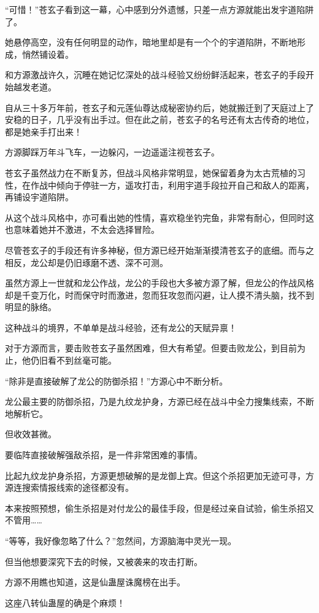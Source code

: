 \begin{this_body}
“可惜！”苍玄子看到这一幕，心中感到分外遗憾，只差一点方源就能出发宇道陷阱了。

她悬停高空，没有任何明显的动作，暗地里却是有一个个的宇道陷阱，不断地形成，悄然铺设着。

和方源激战许久，沉睡在她记忆深处的战斗经验又纷纷鲜活起来，苍玄子的手段开始越发老道。

自从三十多万年前，苍玄子和元莲仙尊达成秘密协约后，她就搬迁到了天庭过上了安稳的日子，几乎没有出手过。但在此之前，苍玄子的名号还有太古传奇的地位，都是她亲手打出来！

方源脚踩万年斗飞车，一边躲闪，一边遥遥注视苍玄子。

苍玄子虽然战力在不断复苏，但战斗风格非常明显，她保留着身为太古荒植的习性，在作战中倾向于停驻一方，遥攻打击，利用宇道手段拉开自己和敌人的距离，再铺设宇道陷阱。

从这个战斗风格中，亦可看出她的性情，喜欢稳坐钓完鱼，非常有耐心，但同时这也意味着她并不激进，不太会选择冒险。

尽管苍玄子的手段还有许多神秘，但方源已经开始渐渐摸清苍玄子的底细。而与之相反，龙公却是仍旧琢磨不透、深不可测。

虽然方源上一世就和龙公作战，龙公的手段也大多被方源了解，但龙公的作战风格却是千变万化，时而保守时而激进，忽而狂攻忽而闪避，让人摸不清头脑，找不到明显的脉络。

这种战斗的境界，不单单是战斗经验，还有龙公的天赋异禀！

对于方源而言，要击败苍玄子虽然困难，但大有希望。但要击败龙公，到目前为止，他仍旧看不到丝毫可能。

“除非是直接破解了龙公的防御杀招！”方源心中不断分析。

龙公最主要的防御杀招，乃是九纹龙护身，方源已经在战斗中全力搜集线索，不断地解析它。

但收效甚微。

要临阵直接破解强敌杀招，是一件非常困难的事情。

比起九纹龙护身杀招，方源更想破解的是龙御上宾。但这个杀招更加无迹可寻，方源连搜索情报线索的途径都没有。

本来按照预想，偷生杀招是对付龙公的最佳手段，但是经过亲自试验，偷生杀招又不管用……

“等等，我好像忽略了什么？”忽然间，方源脑海中灵光一现。

但当他想要深究下去的时候，又被袭来的攻击打断。

方源不用瞧也知道，这是仙蛊屋诛魔榜在出手。

这座八转仙蛊屋的确是个麻烦！


\end{this_body}
